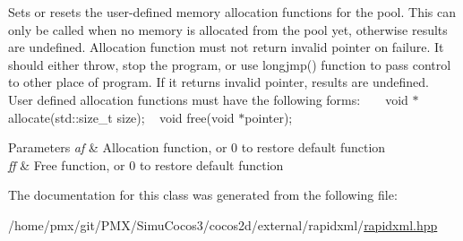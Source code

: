 Sets or resets the user-\/defined memory allocation functions for the pool. This can only be called when no memory is allocated from the pool yet, otherwise results are undefined. Allocation function must not return invalid pointer on failure. It should either throw, stop the program, or use {\ttfamily longjmp()} function to pass control to other place of program. If it returns invalid pointer, results are undefined. ~\newline
~\newline
 User defined allocation functions must have the following forms\+: ~\newline
{\ttfamily  ~\newline
void $\ast$allocate(std\+::size\+\_\+t size); ~\newline
void free(void $\ast$pointer); }~\newline
 
\begin{DoxyParams}{Parameters}
{\em af} & Allocation function, or 0 to restore default function \\
\hline
{\em ff} & Free function, or 0 to restore default function \\
\hline
\end{DoxyParams}


The documentation for this class was generated from the following file\+:\begin{DoxyCompactItemize}
\item 
/home/pmx/git/\+P\+M\+X/\+Simu\+Cocos3/cocos2d/external/rapidxml/\hyperlink{rapidxml_8hpp}{rapidxml.\+hpp}\end{DoxyCompactItemize}
